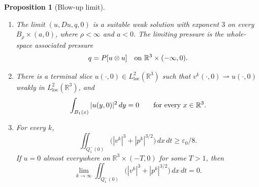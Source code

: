\documentclass[11pt,letterpaper]{article}
\numberwithin{equation}{section}
\theoremstyle{plain}
\newtheorem{proposition}[theorem]{Proposition}
\theoremstyle{definition}
\theoremstyle{remark}
\begin{document}
\begin{proposition}[Blow-up limit]
\begin{enumerate}[label=(\alph*)]
\item The limit \((u,Du,q,0)\) is a suitable weak solution with exponent \(3\) on every \(B_\rho\times(a,0)\), where \(\rho<\infty\) and \(a<0\). The limiting pressure is the whole-space associated pressure
\begin{equation*}
 q=P[u\otimes u]\quad\hbox{on }\mathbb R^3\times(-\infty,0).
\end{equation*}

\item There is a terminal slice \(u(\cdot,0)\in L^2_{\mathrm{loc}}(\mathbb R^3)\) such that \(v^k(\cdot,0)\rightharpoonup u(\cdot,0)\) weakly in \(L^2_{\mathrm{loc}}(\mathbb R^3)\), and
\begin{equation*}
 \int_{B_1(x)}|u(y,0)|^2\,dy=0\qquad\hbox{for every }x\in\mathbb R^3.
\end{equation*}

\item For every \(k\),
\begin{equation*}
 \iint_{Q_1^-(0)}\bigl(|v^k|^3+|p^k|^{3/2}\bigr)\,dx\,dt\ge\varepsilon_0/8.
\end{equation*}
If \(u=0\) almost everywhere on \(\mathbb R^3\times(-T,0)\) for some \(T>1\), then
\begin{equation*}
 \lim_{k\to\infty}\iint_{Q_1^-(0)}
       \bigl(|v^k|^3+|p^k|^{3/2}\bigr)\,dx\,dt=0.
\end{equation*}
\end{enumerate}
\end{proposition}
\end{document}
